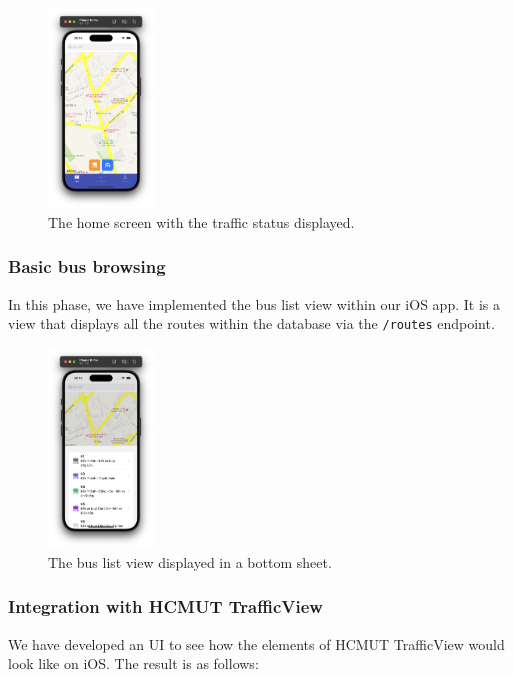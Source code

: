 \begin{figure}[H]
    \centering
    \includegraphics[width=0.25\textwidth]{assets/images/Implementation/traffic_status_view.png}
    \caption{The home screen with the traffic status displayed.}
    \label{fig:traffic_status_view}
\end{figure}

\subsubsection{Basic bus browsing}
In this phase, we have implemented the bus list view within our iOS app. It is a view that displays all the routes within the database via the \lstinline{/routes} endpoint. 
\begin{figure}[H]
    \centering
    \includegraphics[width=0.25\textwidth]{assets/images/Implementation/bus_view.png}
    \caption{The bus list view displayed in a bottom sheet.}
    \label{fig:bus_view_ios}
\end{figure}


\subsubsection{Integration with HCMUT TrafficView}
We have developed an UI to see how the elements of HCMUT TrafficView would look like on iOS. The result is as follows:

